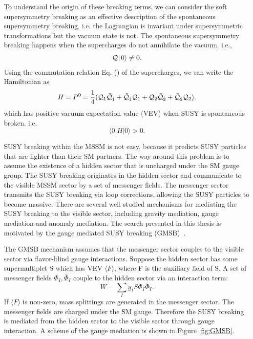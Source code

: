 \documentclass[thesis.tex]{subfiles}
\begin{document}
To understand the origin of these breaking terms, we can consider the soft supersymmetry breaking as an effective description of  the spontaneous supersymmetry breaking, i.e. the Lagrangian is invariant under supersymmetric transformations but the vacuum state is not. 
The spontaneous supersymmetry breaking happens when the supercharges do not annihilate the vacuum, i.e., 
    \begin{equation}
	\mathcal{Q} \ket{0} \neq 0.
    \end{equation}
Using the commutation relation Eq. (\label{eq:commutation}) of the supercharges, we can write the Hamiltonian as
	 \begin{equation}
		H = P^0 = \frac{1}{4}(\mathcal{Q}_1\bar{\mathcal{Q}}_{\dot{1}} + \bar{\mathcal{Q}}_{\dot{1}} \mathcal{Q}_1 + \mathcal{Q}_2 \bar{\mathcal{Q}}_{\dot{2}} + \bar{\mathcal{Q}}_{\dot{2}}  \mathcal{Q}_2 ),
	  \end{equation}
which has positive vacuum expectation value (VEV) when SUSY is spontaneous broken, i.e.
	 \begin{equation}
	\langle 0| H |0 \rangle  > 0.
	\end{equation}

SUSY breaking within the MSSM is not easy, because it predicts SUSY particles that are lighter than their SM partners. 
The way around this problem is to assume the existence of a hidden sector that is uncharged under the SM gauge group. 
The SUSY breaking originates in the hidden sector and communicate to the visible MSSM sector by a set of messenger fields. 
The messenger sector transmits the SUSY breaking via loop corrections, allowing the SUSY particles to become massive. 
There are several well studied mechanisms for mediating the SUSY breaking to the visible sector, including gravity mediation, gauge mediation and anomaly mediation. 
The search presented in this thesis is motivated by the gauge mediated SUSY breaking (GMSB)~\cite{GGM:Shih, GGM:Mariotti, GGM:Rattazzi}. 

The GMSB mechanism assumes that the messenger sector couples to the visible sector via flavor-blind gauge interactions. 
Suppose the hidden sector has some supermultiplet S which has VEV $\langle F \rangle$, where F is the auxiliary field of S. 
A set of messenger fields ${\Phi_I, \bar{\Phi}_I}$ couple to the hidden sector via an interaction term:
	 \begin{equation}
	W = \sum_I y_I S \Phi_I \bar{\Phi}_I.
	\end{equation}
If $\langle F \rangle$ is non-zero, mass splittings are generated in the messenger sector. 
The messenger fields are charged under the SM gauge. 
Therefore the SUSY breaking is mediated from the hidden sector to the visible sector through gauge interaction. A scheme of the gauge mediation is shown in Figure \ref{fig:GMSB}. 
\end{document}
